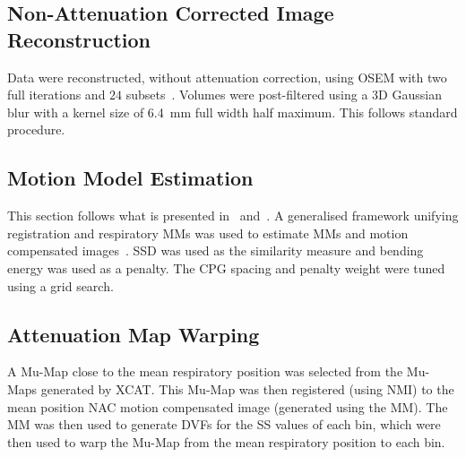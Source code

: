             \subsection{Non-Attenuation Corrected Image Reconstruction} \label{sec:pet_ct_respiratory_motion_correction_with_a_single_attenuation_map_using_nac_derived_deformation_fields_methods_non_attenuation_corrected_image_reconstruction}
                Data were reconstructed, without attenuation correction, using \gls{OSEM} with two full iterations and $24$ subsets~\parencite{Hudson1994}. Volumes were post-filtered using a \gls{3D} Gaussian blur with a kernel size of \SI{6.4}{\milli\metre} full width half maximum. This follows standard procedure.
            
            \subsection{Motion Model Estimation} \label{sec:pet_ct_respiratory_motion_correction_with_a_single_attenuation_map_using_nac_derived_deformation_fields_methods_motion_model_estimation}
                This section follows what is presented in~ and~. A generalised framework unifying registration and respiratory \glspl{MM} was used to estimate \glspl{MM} and motion compensated images~\parencite{McClelland2017}. \gls{SSD} was used as the similarity measure and bending energy was used as a penalty. The \gls{CPG} spacing and penalty weight were tuned using a grid search.
            
            \subsection{Attenuation Map Warping} \label{sec:pet_ct_respiratory_motion_correction_with_a_single_attenuation_map_using_nac_derived_deformation_fields_methods_attenuation_map_warping}
                A \gls{Mu-Map} close to the mean respiratory position was selected from the \glspl{Mu-Map} generated by \gls{XCAT}. This \gls{Mu-Map} was then registered (using \gls{NMI}) to the mean position \gls{NAC} motion compensated image (generated using the \gls{MM}). The \gls{MM} was then used to generate \glspl{DVF} for the \gls{SS} values of each bin, which were then used to warp the \gls{Mu-Map} from the mean respiratory position to each bin.
            

